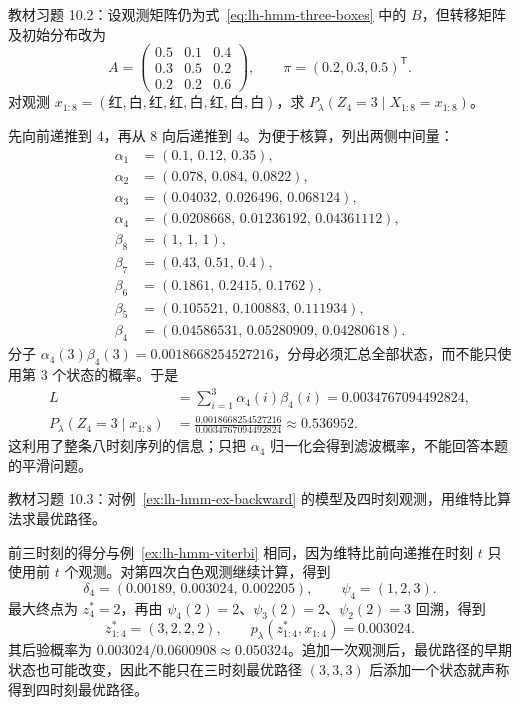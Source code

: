 \begin{example}
\label{ex:lh-hmm-ex-smoothing}
教材习题 10.2：设观测矩阵仍为式~\eqref{eq:lh-hmm-three-boxes} 中的 $B$，但转移矩阵及初始分布改为
\[
 A=\begin{pmatrix}0.5&0.1&0.4\\0.3&0.5&0.2\\0.2&0.2&0.6\end{pmatrix},\qquad
 \pi=(0.2,0.3,0.5)^{\mathsf T}.
\]
对观测 $x_{1:8}=(\text{红},\text{白},\text{红},\text{红},\text{白},\text{红},\text{白},\text{白})$，求 $P_\lambda(Z_4=3\mid X_{1:8}=x_{1:8})$。
\end{example}
\begin{solve}
先向前递推到 $4$，再从 $8$ 向后递推到 $4$。为便于核算，列出两侧中间量：
\[
 \begin{aligned}
 \alpha_1&=(0.1,\,0.12,\,0.35),\\
 \alpha_2&=(0.078,\,0.084,\,0.0822),\\
 \alpha_3&=(0.04032,\,0.026496,\,0.068124),\\
 \alpha_4&=(0.0208668,\,0.01236192,\,0.04361112),\\
 \beta_8&=(1,\,1,\,1),\\
 \beta_7&=(0.43,\,0.51,\,0.4),\\
 \beta_6&=(0.1861,\,0.2415,\,0.1762),\\
 \beta_5&=(0.105521,\,0.100883,\,0.111934),\\
 \beta_4&=(0.04586531,\,0.05280909,\,0.04280618).
 \end{aligned}
\]
分子 $\alpha_4(3)\beta_4(3)=0.0018668254527216$，分母必须汇总全部状态，而不能只使用第 $3$ 个状态的概率。于是
\[
 \begin{aligned}
 L&=\sum_{i=1}^3\alpha_4(i)\beta_4(i)=0.0034767094492824,\\
 P_\lambda(Z_4=3\mid x_{1:8})
 &=\frac{0.0018668254527216}{0.0034767094492824}\approx0.536952.
 \end{aligned}
\]
这利用了整条八时刻序列的信息；只把 $\alpha_4$ 归一化会得到滤波概率，不能回答本题的平滑问题。
\end{solve}

\begin{example}
\label{ex:lh-hmm-ex-path}
教材习题 10.3：对例~\ref{ex:lh-hmm-ex-backward} 的模型及四时刻观测，用维特比算法求最优路径。
\end{example}
\begin{solve}
前三时刻的得分与例~\ref{ex:lh-hmm-viterbi} 相同，因为维特比前向递推在时刻 $t$ 只使用前 $t$ 个观测。对第四次白色观测继续计算，得到
\[
 \delta_4=(0.00189,\,0.003024,\,0.002205),\qquad \psi_4=(1,2,3).
\]
最大终点为 $z_4^*=2$，再由 $\psi_4(2)=2$、$\psi_3(2)=2$、$\psi_2(2)=3$ 回溯，得到
\[
 z_{1:4}^*=(3,2,2,2),\qquad
 p_\lambda(z_{1:4}^*,x_{1:4})=0.003024.
\]
其后验概率为 $0.003024/0.0600908\approx0.050324$。追加一次观测后，最优路径的早期状态也可能改变，因此不能只在三时刻最优路径 $(3,3,3)$ 后添加一个状态就声称得到四时刻最优路径。
\end{solve}

